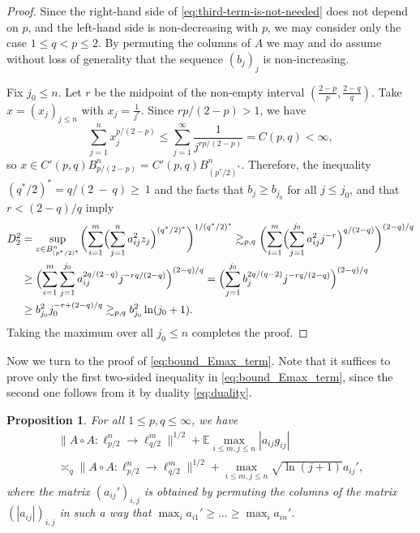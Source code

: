 \documentclass[a4paper]{amsart}
\newtheorem{proposition}[theorem]{Proposition} %
\theoremstyle{definition}
\theoremstyle{remark}
\numberwithin{equation}{section}
\newcommand*{\EE}{\mathbb{E}}
\newcommand*{\hadprod}{\mathbin{\circ}} %
\begin{document}
\begin{proof}
	Since the right-hand side of \eqref{eq:third-term-is-not-needed} does not depend on $p$, and the left-hand side is non-decreasing with $p$, we may consider only the case $1\le q<p\le 2$.
	By permuting the columns of $A$  we may and do assume without loss of generality that the sequence $(b_j)_j$ is non-increasing.

	 Fix $j_0\le n$. Let $r$ be the midpoint of the non-empty interval $(\frac{2-p}p, \frac{2-q}q)$.  Take $x=(x_j)_{j\le n}$ with $x_j=\frac{1}{j^r}$. Since $rp/(2-p)>1$, we have
	\[
		\sum_{j=1}^n x_j^{p/(2-p)} \le \sum_{j=1}^\infty \frac{1}{j^{rp/{(2-p)}}} =C(p,q)<\infty,
	\] 
	so $x\in C'(p,q)B^n_{p/(2-p)}=C'(p,q)B^n_{(p^\ast/2)^\ast}$. Therefore, the inequality $(q^\ast/2)^\ast = q/(2~-~q) \ge~1$ and the facts that $b_j\ge b_{j_0}$ for all $j\le j_0$, and that $r<(2-q)/q$ imply
	\begin{align*}
		D_2^2 & = \sup_{z\in B_{(p^\ast/2)^\ast}^n} \biggl( \sum_{i=1}^m \Bigl( \sum_{j=1}^n a_{ij}^2 z_j\Bigr)^{(q^\ast/2)^\ast} \biggr)^{1/(q^\ast/2)^\ast} 
		\gtrsim_{p,q} \biggl( \sum_{i=1}^m \Bigl( \sum_{j=1}^{j_0} a_{ij}^2 j^{-r}\Bigr)^{q/(2-q)} \biggr)^{(2-q)/q} 
		\\
		& \ge  \Bigl( \sum_{i=1}^m  \sum_{j=1}^{j_0} a_{ij}^{2q/(2-q)} j^{-{rq/(2-q)}} \Bigr)^{(2-q)/q} 
		=   \Bigl(  \sum_{j=1}^{j_0} b_j^{2q/(q-2)} j^{-{rq/(2-q)}} \Bigr)^{(2-q)/q}
		\\
		& \ge b_{j_0}^2j_0^{-r+(2-q)/q } \gtrsim_{p,q} b_{j_0}^2 \ln(j_0+1).
	\end{align*}
	Taking the maximum over all $j_0\le n$ completes the proof.
\end{proof}

Now we turn to the proof of \eqref{eq:bound_Emax_term}. Note that it suffices to prove only the first two-sided inequality in \eqref{eq:bound_Emax_term}, since the second one follows from it by duality \eqref{eq:duality}.

\begin{proposition}
	For all $1\le p, q\le \infty$, we have
\begin{multline}		\label{eq:bound_Emax_term-last-section}
	\|A\hadprod A \colon \ell^n_{p/2} \to \ell^m_{q/2} \|^{1/2}+ \EE \max_{i \le m,j\le n} |a_{ij}g_{ij}| 
	\\
	\asymp_{q} \|A\hadprod A \colon \ell^n_{p/2} \to \ell^m_{q/2} \|^{1/2}+\max_{i\le m, j\le n}\sqrt{\ln (j+1)} a_{ij}',
\end{multline}
where the matrix $(a_{ij}')_{i,j}$  is obtained by permuting the columns of the matrix $(|a_{ij}|)_{i,j}$ in such a way that $\max_i a_{i1}'\ge \dots \ge \max_i a_{in}'$.
\end{proposition}
\end{document}
